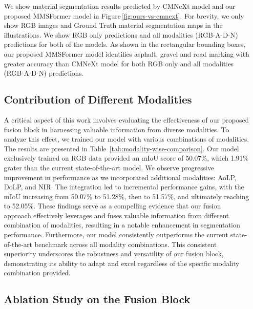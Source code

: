 \documentclass{article}
\begin{document}
We show material segmentation results predicted by CMNeXt \cite{zhang2023CMNext} model and our proposed MMSFormer model in Figure\,\ref{fig:ours-vs-cmnext}. For brevity, we only show RGB images and Ground Truth material segmentation maps in the illustrations. We show RGB only predictions and all modalities (RGB-A-D-N) predictions for both of the models. As shown in the rectangular bounding boxes, our proposed MMSFormer model identifies asphalt, gravel and road marking with greater accuracy than CMNeXt \cite{zhang2023CMNext} model for both RGB only and all modalities (RGB-A-D-N) predictions. 

\subsection{Contribution of Different Modalities}
A critical aspect of this work involves evaluating the effectiveness of our proposed fusion block in harnessing valuable information from diverse modalities. To analyze this effect, we trained our model with various combinations of modalities. The results are presented in Table~\ref{tab:modality-wise-comparison}. Our model exclusively trained on RGB data provided an mIoU score of 50.07\%, which 1.91\% grater than the current state-of-the-art model. We observe progressive improvement in performance as we incorporated additional modalities: AoLP, DoLP, and NIR. The integration led to incremental performance gains, with the mIoU increasing from 50.07\% to 51.28\%, then to 51.57\%, and ultimately reaching to 52.05\%. These findings serve as a compelling evidence that our fusion approach effectively leverages and fuses valuable information from different combination of modalities, resulting in a notable enhancement in segmentation performance. 
Furthermore, our model consistently outperforms the current state-of-the-art benchmark across all modality combinations. This consistent superiority underscores the robustness and versatility of our fusion block, demonstrating its ability to adapt and excel regardless of the specific modality combination provided. 

\subsection{Ablation Study on the Fusion Block}
\end{document}
